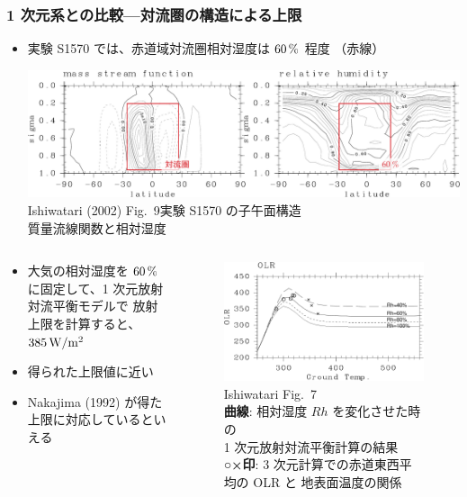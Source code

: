 \documentclass[aspectratio=149,9pt,fleqn]{beamer}
\newcommand{\hmemph}[1]{\textbf{#1}}
\begin{document}
\begin{frame}
	\frametitle{1 次元系との比較---対流圏の構造による上限}
	\begin{itemize}
		\item 実験 S1570 では、赤道域対流圏相対湿度は \(60\hmu{\%}\) 程度
			\textcolor[cmyk]{0,1,1,0}{（赤線）}
			\begin{center}
				\includegraphics[width=.7\textwidth]{zu-aka.pdf}\\
					\scriptsize Ishiwatari \etal (2002) Fig.\ 9\quad 実験 S1570 の子午面構造\\
					質量流線関数と相対湿度
			\end{center}
	\end{itemize}
	\begin{columns}[T,onlytextwidth]
		\begin{column}{.48\textwidth}
			\begin{itemize}
				\item 大気の相対湿度を \(60\hmu{\%}\) に固定して、1 次元放射対流平衡モデルで
					放射上限を計算すると、\(385\hmu{W/m^2}\)
				\item 得られた上限値に近い
				\item Nakajima \etal (1992) が得た上限に対応しているといえる
			\end{itemize}
		\end{column}
		\begin{column}{.5\textwidth}
			\begin{figure}
				\scriptsize
				\includegraphics[width=.7\textwidth]{./fig/Tg-OLR-1dimL99-3dEq-crop.pdf}\\
				Ishiwatari \etal Fig.~7\\
				\hmemph{曲線}: 相対湿度 \(\mathit{Rh}\) を変化させた時の\\
				1 次元放射対流平衡計算の結果\\
				\hmemph{○×印}: 3 次元計算での赤道東西平均の OLR と 地表面温度の関係
			\end{figure}
		\end{column}
	\end{columns}
\end{frame}
\end{document}
